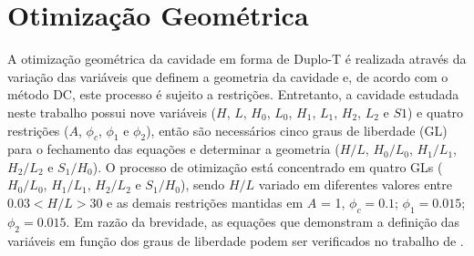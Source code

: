 \documentclass[12pt,A4,A4pt]{article}
\begin{document}
\section{Otimização Geométrica}
\label{opt}
\hspace{0.5cm}A otimização geométrica da cavidade em forma de Duplo-T é realizada através da variação das variáveis que definem a geometria da cavidade e, de acordo com o método DC, este processo é sujeito a restrições. Entretanto, a cavidade estudada neste trabalho possui nove variáveis ($H$, $L$, $H_{0}$, $L_{0}$, $H_{1}$, $L_{1}$, $H_{2}$, $L_{2}$ e $S1$) e quatro restrições ($A$, $\phi_{c}$, $\phi_{1}$ e $\phi_{2}$), então são necessários cinco graus de liberdade (GL) para o fechamento das equações e determinar a geometria ($H/L$, $H_{0}/L_{0}$, $H_{1}/L_{1}$, $H_{2}/L_{2}$ e $S_{1}/H_{0}$). O processo de otimização está concentrado em quatro GLs ( $H_{0}/L_{0}$, $H_{1}/L_{1}$, $H_{2}/L_{2}$ e $S_{1}/H_{0}$), sendo $H/L$ variado em diferentes valores entre $0.03< H/L >30$ e as demais restrições mantidas em $A$ = 1, $\phi_{c}=0.1$; $\phi_{1} =0.015$; $\phi_{2}=0.015$. Em razão da brevidade, as equações que demonstram a definição das variáveis em função dos graus de liberdade podem ser verificados no trabalho de \cite{Gonzales2015cilamce}.


\end{document}
